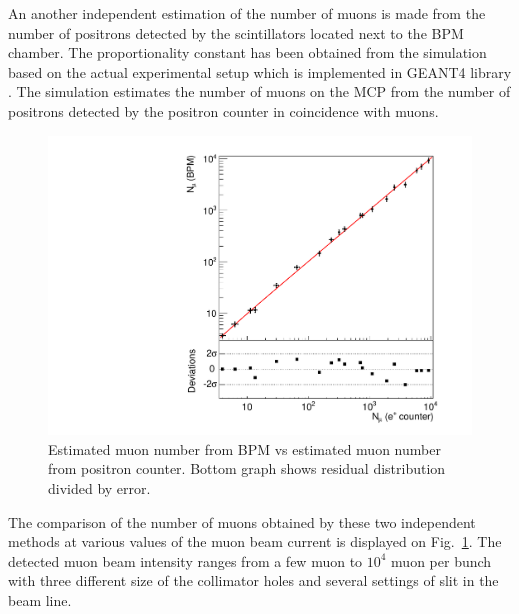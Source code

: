 \documentclass[preprint,3p,twocolumn]{elsarticle}
\begin{document}
An another independent estimation of the number of muons is made from the number of positrons detected by the scintillators located next to the BPM chamber. The proportionality constant has been obtained from the simulation based on the actual experimental setup which is implemented in GEANT4 library \cite{geant4}. 
The simulation estimates the number of muons on the MCP from the number of positrons detected by the positron counter in coincidence with muons. 
\begin{figure}[tb]
\begin{minipage}[t]{60mm}
\includegraphics[width=1.3\textwidth, height=1.3\textwidth]{figure/lin.pdf}
\end{minipage}
\caption{Estimated muon number from BPM vs estimated muon number from positron counter. 
Bottom graph shows residual distribution divided by error.}

	\label{fig:muvsmu}
\end{figure}

The comparison of the number of muons obtained by these two independent methods at various values of the muon beam current is displayed on Fig.~\ref{fig:muvsmu}. The detected muon beam intensity ranges from a few muon to $10^{4}$ muon per bunch with three different size of the collimator holes and several settings of slit in the beam line.
\end{document}
